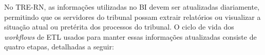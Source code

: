 No TRE-RN, as informações utilizadas no BI devem ser atualizadas diariamente, permitindo que os servidores do tribunal possam extrair relatórios ou visualizar a situação atual ou pretérita dos processos do tribunal. O ciclo de vida dos \emph{workflows} de ETL usados para manter essas informações atualizadas consiste de quatro etapas, detalhadas a seguir:

